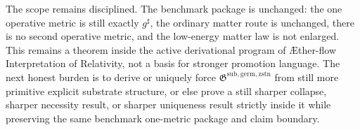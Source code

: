\documentclass[11pt]{article}
\newcommand{\Aflow}{\AE{}ther-flow}
\newcommand{\TheoryName}{\Aflow{} Interpretation of Relativity}
\newcommand{\CompletedMetric}{g^{\sharp}}
\newcommand{\GermNucleus}{\mathfrak G^{\mathrm{sub,germ,zstn}}}
\begin{document}
The scope remains disciplined. The benchmark package is unchanged: the one operative metric is still exactly \(\CompletedMetric\), the ordinary matter route is unchanged, there is no second operative metric, and the low-energy matter law is not enlarged. This remains a theorem inside the active derivational program of \TheoryName{}, not a basis for stronger promotion language. The next honest burden is to derive or uniquely force \(\GermNucleus\) from still more primitive explicit substrate structure, or else prove a still sharper collapse, sharper necessity result, or sharper uniqueness result strictly inside it while preserving the same benchmark one-metric package and claim boundary.
\end{document}

